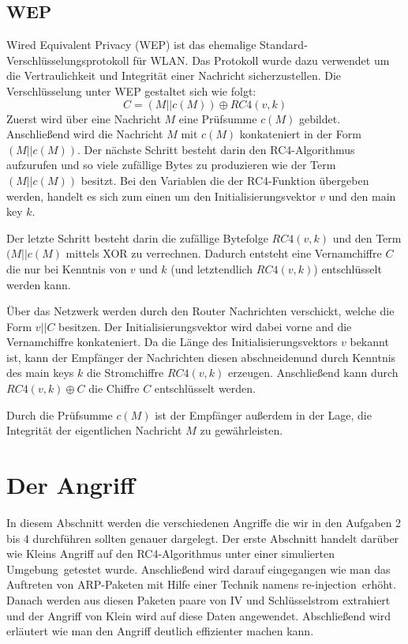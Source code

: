 \documentclass[10pt,a4paper]{article}
\begin{document}
\subsection{WEP}
Wired Equivalent Privacy (WEP) ist das ehemalige Standard-Verschlüsselungsprotokoll für WLAN. Das Protokoll wurde dazu verwendet um die Vertraulichkeit und Integrität einer Nachricht sicherzustellen. Die Verschlüsselung unter WEP gestaltet sich wie folgt:
$$
C = (M || c(M)) \oplus RC4(v,k)
$$
Zuerst wird über eine Nachricht $M$ eine Prüfsumme $c(M)$ gebildet. Anschließend wird die Nachricht $M$ mit $c(M)$ konkateniert in der Form $(M || c(M))$. Der nächste Schritt besteht darin den RC4-Algorithmus aufzurufen und so viele zufällige Bytes zu produzieren wie der Term $(M || c(M))$ besitzt. Bei den Variablen die der RC4-Funktion übergeben werden, handelt es sich zum einen um den Initialisierungsvektor $v$ und den main key $k$.

Der letzte Schritt besteht darin die zufällige Bytefolge $RC4(v,k)$ und den Term $(M || c(M)$ mittels XOR zu verrechnen. Dadurch entsteht eine Vernamchiffre $C$ die nur bei Kenntnis von $v$ und $k$ (und letztendlich $RC4(v,k)$) entschlüsselt werden kann.

Über das Netzwerk werden durch den Router Nachrichten verschickt, welche die Form $v || C$ besitzen. Der Initialisierungsvektor wird dabei vorne and die Vernamchiffre konkateniert. Da die Länge des Initialisierungsvektors $v$ bekannt ist, kann der Empfänger der Nachrichten diesen \glqq abschneiden\grqq und durch Kenntnis des main keys $k$ die Stromchiffre $RC4(v,k)$ erzeugen. Anschließend kann durch $RC4(v,k) \oplus C$ die Chiffre $C$ entschlüsselt werden.

Durch die Prüfsumme $c(M)$ ist der Empfänger außerdem in der Lage, die Integrität der eigentlichen Nachricht $M$ zu gewährleisten. 

\section{Der Angriff}
In diesem Abschnitt werden die verschiedenen Angriffe die wir in den Aufgaben 2 bis 4 durchführen sollten genauer dargelegt. Der erste Abschnitt handelt darüber wie Kleins Angriff auf den RC4-Algorithmus unter einer \glqq simulierten Umgebung\grqq \ getestet wurde. Anschließend wird darauf eingegangen wie man das Auftreten von ARP-Paketen  mit Hilfe einer Technik namens \glqq re-injection\grqq \ erhöht. Danach werden aus diesen Paketen paare von IV und Schlüsselstrom extrahiert und der Angriff von Klein wird auf diese Daten angewendet. Abschließend wird erläutert wie man den Angriff deutlich effizienter machen kann.
\end{document}
